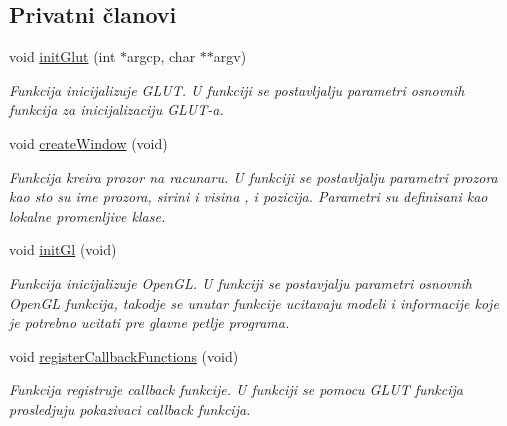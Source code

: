 \subsection*{Privatni članovi}
\begin{DoxyCompactItemize}
\item 
void \hyperlink{classcore_1_1Engine_a737de95b00aa5b62c466f2e3dc4edcdb}{init\+Glut} (int $\ast$argcp, char $\ast$$\ast$argv)
\begin{DoxyCompactList}\small\item\em Funkcija inicijalizuje G\+L\+UT. U funkciji se postavljalju parametri osnovnih funkcija za inicijalizaciju G\+L\+U\+T-\/a. \end{DoxyCompactList}\item 
void \hyperlink{classcore_1_1Engine_ad6d0e175eff6ec04d3e5af53a78443ef}{create\+Window} (void)
\begin{DoxyCompactList}\small\item\em Funkcija kreira prozor na racunaru. U funkciji se postavljalju parametri prozora kao sto su ime prozora, sirini i visina , i pozicija. Parametri su definisani kao lokalne promenljive klase. \end{DoxyCompactList}\item 
void \hyperlink{classcore_1_1Engine_a6cfe680acf87f9882f92b1ffc134021f}{init\+Gl} (void)
\begin{DoxyCompactList}\small\item\em Funkcija inicijalizuje Open\+GL. U funkciji se postavjalju parametri osnovnih Open\+GL funkcija, takodje se unutar funkcije ucitavaju modeli i informacije koje je potrebno ucitati pre glavne petlje programa. \end{DoxyCompactList}\item 
void \hyperlink{classcore_1_1Engine_a4a8c96ce1172195507d2233479837ad2}{register\+Callback\+Functions} (void)
\begin{DoxyCompactList}\small\item\em Funkcija registruje callback funkcije. U funkciji se pomocu G\+L\+UT funkcija prosledjuju pokazivaci callback funkcija. \end{DoxyCompactList}\end{DoxyCompactItemize}
